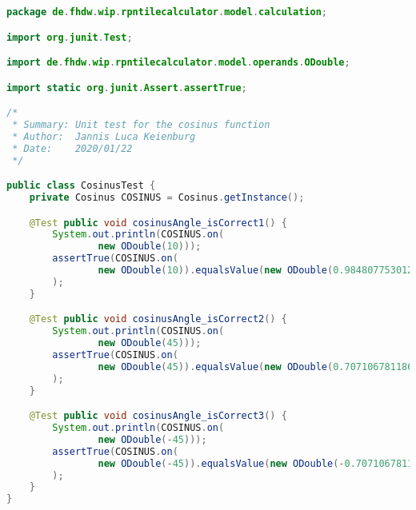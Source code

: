 \begin{lstlisting}[caption=CosinusTest (Keienburg),label=list:CosinusTest,language=Java]
package de.fhdw.wip.rpntilecalculator.model.calculation;

import org.junit.Test;

import de.fhdw.wip.rpntilecalculator.model.operands.ODouble;

import static org.junit.Assert.assertTrue;

/*
 * Summary: Unit test for the cosinus function
 * Author:  Jannis Luca Keienburg
 * Date:    2020/01/22
 */

public class CosinusTest {
    private Cosinus COSINUS = Cosinus.getInstance();

    @Test public void cosinusAngle_isCorrect1() {
        System.out.println(COSINUS.on(
                new ODouble(10)));
        assertTrue(COSINUS.on(
                new ODouble(10)).equalsValue(new ODouble(0.984807753012208))
        );
    }

    @Test public void cosinusAngle_isCorrect2() {
        System.out.println(COSINUS.on(
                new ODouble(45)));
        assertTrue(COSINUS.on(
                new ODouble(45)).equalsValue(new ODouble(0.7071067811865476))
        );
    }

    @Test public void cosinusAngle_isCorrect3() {
        System.out.println(COSINUS.on(
                new ODouble(-45)));
        assertTrue(COSINUS.on(
                new ODouble(-45)).equalsValue(new ODouble(-0.7071067811865476))
        );
    }
}
\end{lstlisting} 

